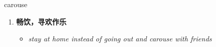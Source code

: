 
\begin{frame}
{\huge carouse}
\begin{center}
\begin{enumerate}\Large
  \item \textbf{畅饮，寻欢作乐}
  \begin{itemize}
    \item \em{\Large{stay at home instead of going out and carouse with friends}}
  \end{itemize}
\end{enumerate}
\end{center}
\end{frame}
